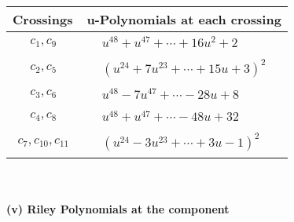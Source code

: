 \documentclass[1p]{elsarticle_modified}
\theoremstyle{definition}
\begin{document}
\begin{tabular}{m{50pt}|m{274pt}}
Crossings & \hspace{64pt}u-Polynomials at each crossing \\
\hline $$\begin{aligned}c_{1},c_{9}\end{aligned}$$&$\begin{aligned}
&u^{48}+u^{47}+\cdots+16 u^2+2
\end{aligned}$\\
\hline $$\begin{aligned}c_{2},c_{5}\end{aligned}$$&$\begin{aligned}
&(u^{24}+7 u^{23}+\cdots+15 u+3)^{2}
\end{aligned}$\\
\hline $$\begin{aligned}c_{3},c_{6}\end{aligned}$$&$\begin{aligned}
&u^{48}-7 u^{47}+\cdots-28 u+8
\end{aligned}$\\
\hline $$\begin{aligned}c_{4},c_{8}\end{aligned}$$&$\begin{aligned}
&u^{48}+u^{47}+\cdots-48 u+32
\end{aligned}$\\
\hline $$\begin{aligned}c_{7},c_{10},c_{11}\end{aligned}$$&$\begin{aligned}
&(u^{24}-3 u^{23}+\cdots+3 u-1)^{2}
\end{aligned}$\\
\hline
\end{tabular}\\~\\
\newpage\renewcommand{\arraystretch}{1}
\flushleft \textbf{(v) Riley Polynomials at the component}\newline \\
\end{document}

